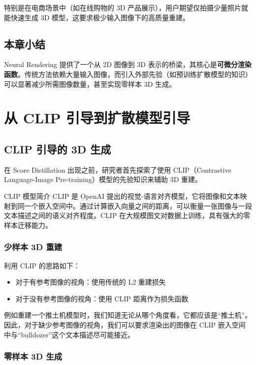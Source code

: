 \documentclass[a4paper]{article}
\begin{document}
特别是在电商场景中（如在线购物的 3D 产品展示），用户期望仅拍摄少量照片就能快速生成 3D 模型，这要求极少输入图像下的高质量重建。

\subsection{本章小结}

Neural Rendering 提供了一个从 2D 图像到 3D 表示的桥梁，其核心是\textbf{可微分渲染函数}。传统方法依赖大量输入图像，而引入外部先验（如预训练扩散模型的知识）可以显著减少所需图像数量，甚至实现零样本 3D 生成。

\newpage
\section{从 CLIP 引导到扩散模型引导}

\subsection{CLIP 引导的 3D 生成}

在 Score Distillation 出现之前，研究者首先探索了使用 CLIP（Contrastive Language-Image Pre-training）模型的先验知识来辅助 3D 重建。

\begin{knowledgebox}{CLIP 模型简介}
CLIP 是 OpenAI 提出的视觉-语言对齐模型，它将图像和文本映射到同一个嵌入空间中。通过计算嵌入向量之间的距离，可以衡量一张图像与一段文本描述之间的语义对齐程度。CLIP 在大规模图文对数据上训练，具有强大的零样本迁移能力。
\end{knowledgebox}

\subsubsection{少样本 3D 重建}

利用 CLIP 的思路如下：
\begin{itemize}
    \item 对于有参考图像的视角：使用传统的 L2 重建损失
    \item 对于没有参考图像的视角：使用 CLIP 距离作为损失函数
\end{itemize}

例如重建一个推土机模型时，我们知道无论从哪个角度看，它都应该是``推土机''。因此，对于缺少参考图像的视角，我们可以要求渲染出的图像在 CLIP 嵌入空间中与``bulldozer''这个文本描述尽可能接近。

\subsubsection{零样本 3D 生成}
\end{document}
